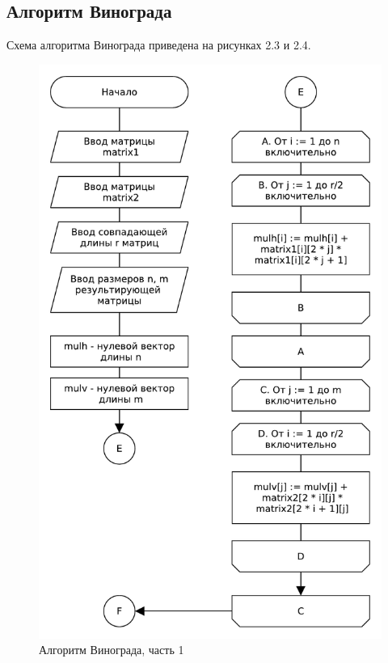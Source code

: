 \subsection{Алгоритм Винограда}
Схема алгоритма Винограда приведена на рисунках 2.3 и 2.4.
\begin{figure}[H]
    \centering
    \includegraphics[scale=0.75]{pdf/winograd-part1.pdf}
    \caption{Алгоритм Винограда, часть 1}
\end{figure}

